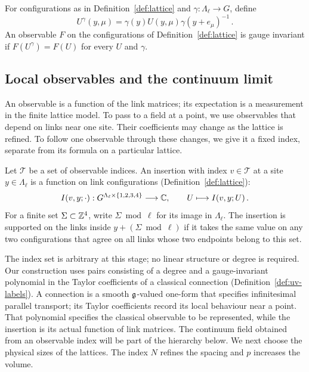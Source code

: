 \begin{definition}\label{def:gauge-transform}
For configurations as in Definition~\ref{def:lattice} and $\gamma:\Lambda_\ell\to G$, define
\begin{equation}\label{eq:gauge-transform}
U^\gamma(y,\mu)=\gamma(y)U(y,\mu)\gamma(y+e_\mu)^{-1}\,.
\end{equation}
An observable $F$ on the configurations of Definition~\ref{def:lattice} is gauge invariant if $F(U^\gamma)=F(U)$ for every $U$ and $\gamma$.
\end{definition}

\subsection{Local observables and the continuum limit}\label{subsec:observables}

An observable is a function of the link matrices; its expectation is a measurement in the finite lattice model.
To pass to a field at a point, we use observables that depend on links near one site.
Their coefficients may change as the lattice is refined.
To follow one observable through these changes, we give it a fixed index, separate from its formula on a particular lattice.

\begin{definition}\label{def:observables}
Let $\mathcal T$ be a set of observable indices.
An insertion with index $v\in\mathcal T$ at a site $y\in\Lambda_\ell$ is a function on link configurations (Definition~\ref{def:lattice}):
\begin{equation}\label{eq:observable-insertion}
I(v,y;\cdot):G^{\Lambda_\ell\times\{1,2,3,4\}}\longrightarrow\mathbb C,
\qquad U\longmapsto I(v,y;U)\,.
\end{equation}
For a finite set $\Sigma\subset\mathbb Z^4$, write $\Sigma\bmod\ell$ for its image in $\Lambda_\ell$.
The insertion is supported on the links inside $y+(\Sigma\bmod\ell)$ if it takes the same value on any two configurations that agree on all links whose two endpoints belong to this set.
\end{definition}

The index set is arbitrary at this stage; no linear structure or degree is required.
Our construction uses pairs consisting of a degree and a gauge-invariant polynomial in the Taylor coefficients of a classical connection (Definition~\ref{def:uv-labels}).
A connection is a smooth $\mathfrak g$-valued one-form that specifies infinitesimal parallel transport; its Taylor coefficients record its local behaviour near a point.
That polynomial specifies the classical observable to be represented, while the insertion is its actual function of link matrices.
The continuum field obtained from an observable index will be part of the hierarchy below.
We next choose the physical sizes of the lattices.
The index $N$ refines the spacing and $p$ increases the volume.

